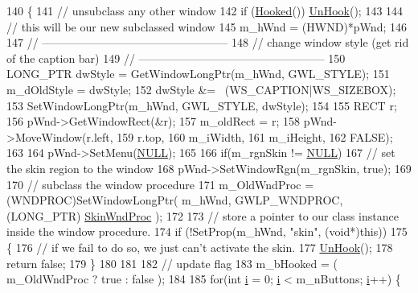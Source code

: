\begin{DoxyCode}
140 \{
141   \textcolor{comment}{// unsubclass any other window}
142   \textcolor{keywordflow}{if} (\mbox{\hyperlink{class_c_skin_a99b438d858bbafa83569f19e707ba3c9}{Hooked}}()) \mbox{\hyperlink{class_c_skin_ab8237ed204df8eb4632ef3bc921783a3}{UnHook}}();
143 
144   \textcolor{comment}{// this will be our new subclassed window}
145   m\_hWnd = (HWND)*pWnd;
146 
147   \textcolor{comment}{// --------------------------------------------------}
148   \textcolor{comment}{// change window style (get rid of the caption bar)}
149   \textcolor{comment}{// --------------------------------------------------}
150   LONG\_PTR dwStyle = GetWindowLongPtr(m\_hWnd, GWL\_STYLE);
151   m\_dOldStyle = dwStyle;
152   dwStyle &= ~(WS\_CAPTION|WS\_SIZEBOX);
153   SetWindowLongPtr(m\_hWnd, GWL\_STYLE, dwStyle);
154 
155   RECT r;
156   pWnd->GetWindowRect(&r);
157   m\_oldRect = r;
158   pWnd->MoveWindow(r.left,
159                    r.top,
160                    m\_iWidth,
161                    m\_iHeight,
162                    FALSE);
163   
164   pWnd->SetMenu(\mbox{\hyperlink{getopt1_8c_a070d2ce7b6bb7e5c05602aa8c308d0c4}{NULL}});
165   
166   \textcolor{keywordflow}{if}(m\_rgnSkin != \mbox{\hyperlink{getopt1_8c_a070d2ce7b6bb7e5c05602aa8c308d0c4}{NULL}})
167     \textcolor{comment}{// set the skin region to the window}
168     pWnd->SetWindowRgn(m\_rgnSkin, \textcolor{keyword}{true});    
169 
170   \textcolor{comment}{// subclass the window procedure}
171   m\_OldWndProc = (WNDPROC)SetWindowLongPtr( m\_hWnd, GWLP\_WNDPROC, (LONG\_PTR)
      \mbox{\hyperlink{class_c_skin_ac58ecd226acd172d4941912f99e2cb12}{SkinWndProc}} );
172 
173   \textcolor{comment}{// store a pointer to our class instance inside the window procedure.}
174   \textcolor{keywordflow}{if} (!SetProp(m\_hWnd, \textcolor{stringliteral}{"skin"}, (\textcolor{keywordtype}{void}*)\textcolor{keyword}{this}))
175     \{
176       \textcolor{comment}{// if we fail to do so, we just can't activate the skin.}
177       \mbox{\hyperlink{class_c_skin_ab8237ed204df8eb4632ef3bc921783a3}{UnHook}}();
178       \textcolor{keywordflow}{return} \textcolor{keyword}{false};
179     \}
180 
181   
182   \textcolor{comment}{// update flag}
183   m\_bHooked = ( m\_OldWndProc ? true : false );
184 
185   \textcolor{keywordflow}{for}(\textcolor{keywordtype}{int} \mbox{\hyperlink{expr-lex_8cpp_acb559820d9ca11295b4500f179ef6392}{i}} = 0; \mbox{\hyperlink{expr-lex_8cpp_acb559820d9ca11295b4500f179ef6392}{i}} < m\_nButtons; \mbox{\hyperlink{expr-lex_8cpp_acb559820d9ca11295b4500f179ef6392}{i}}++) \{

\end{DoxyCode}
